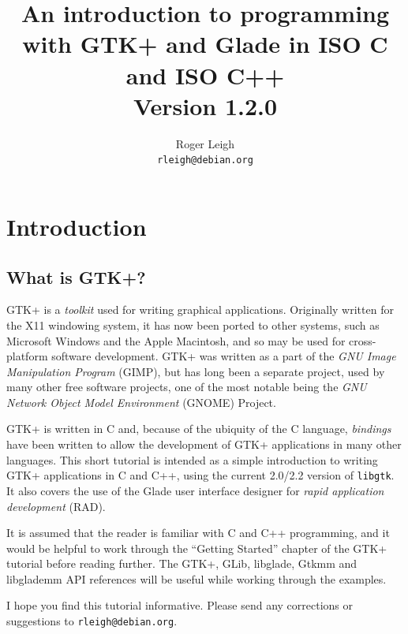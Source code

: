 \documentclass[a4paper,oneside]{article}
\newcommand{\filename}[1]{\texttt{#1}}
\begin{document}
\title{An introduction to programming with GTK+ and Glade in ISO C and
  ISO C++\\\bigskip\large{Version 1.2.0}}
\author{Roger Leigh\\\texttt{rleigh@debian.org}}
\maketitle

\tableofcontents

\listoffigures

\lstlistoflistings


\section{Introduction}

\subsection{What is GTK+?}

GTK+ is a \emph{toolkit} used for writing graphical applications.
Originally written for the X11 windowing system, it has now been
ported to other systems, such as Microsoft Windows and the Apple
Macintosh, and so may be used for cross-platform software development.
GTK+ was written as a part of the \emph{GNU Image Manipulation
  Program} (GIMP), but has long been a separate project, used by many
other free software projects, one of the most notable being the
\emph{GNU Network Object Model Environment} (GNOME) Project.

GTK+ is written in C and, because of the ubiquity of the C language,
\emph{bindings} have been written to allow the development of GTK+
applications in many other languages.  This short tutorial is intended
as a simple introduction to writing GTK+ applications in C and C++,
using the current 2.0/2.2 version of \filename{libgtk}.  It also
covers the use of the Glade user interface designer for \emph{rapid
  application development} (RAD).

It is assumed that the reader is familiar with C and C++ programming,
and it would be helpful to work through the ``Getting Started''
chapter of the GTK+ tutorial before reading further.  The GTK+, GLib,
libglade, Gtkmm and libglademm API references will be useful while
working through the examples.

I hope you find this tutorial informative.  Please send any
corrections or suggestions to \texttt{rleigh@debian.org}.
\end{document}
